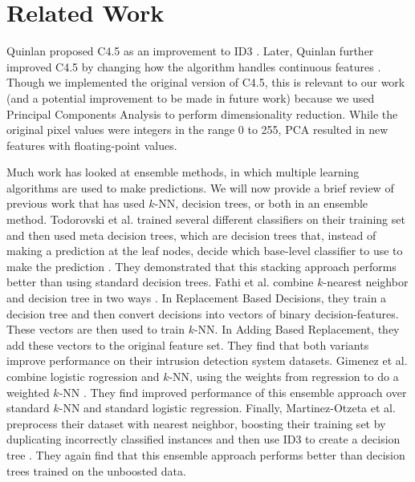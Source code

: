 \section{Related Work}
Quinlan proposed C4.5 as an improvement to ID3 \cite{quinlan2014c4}. Later, Quinlan further improved C4.5 by changing how the algorithm handles continuous features \cite{quinlan1996improved}. Though we implemented the original version of C4.5, this is relevant to our work (and a potential improvement to be made in future work) because we used Principal Components Analysis to perform dimensionality reduction.  While the original pixel values were integers in the range 0 to 255, PCA resulted in new features with floating-point values.

Much work has looked at ensemble methods, in which multiple learning algorithms are used to make predictions. We will now provide a brief review of previous work that has used $k$-NN, decision trees, or both in an ensemble method. Todorovski et al. trained several different classifiers on their training set and then used meta decision trees, which are decision trees that, instead of making a prediction at the leaf nodes, decide which base-level classifier to use to make the prediction \cite{todorovski2003combining}. They demonstrated that this stacking approach performs better than using standard decision trees.
Fathi et al. combine $k$-nearest neighbor and decision tree in two ways \cite{FathiMazinani}. In Replacement Based Decisions, they train a decision tree and then convert decisions into vectors of binary decision-features. These vectors are then used to train $k$-NN. In Adding Based Replacement, they add these vectors to the original feature set. They find that both variants improve performance on their intrusion detection system datasets.
Gimenez et al. combine logistic rogression and $k$-NN, using the weights from regression to do a weighted $k$-NN \cite{campillo2013improving}. They find improved performance of this ensemble approach over standard $k$-NN and standard logistic regression. Finally, Martinez-Otzeta et al. preprocess their dataset with nearest neighbor, boosting their training set by duplicating incorrectly classified instances and then use ID3 to create a decision tree \cite{martinezk}. They again find that this ensemble approach performs better than decision trees trained on the unboosted data. 
